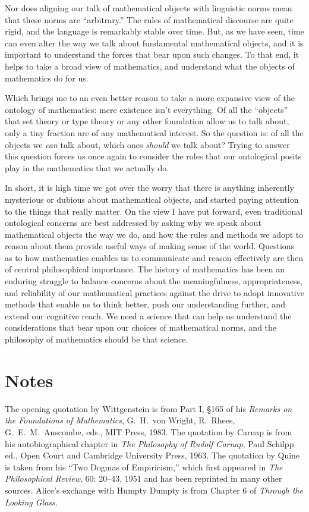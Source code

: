 \documentclass[11pt]{article}
\begin{document}
Nor does aligning our talk of mathematical objects with linguistic norms mean that these norms are ``arbitrary.'' The rules of mathematical discourse are quite rigid, and the language is remarkably stable over time. But, as we have seen, time can even alter the way we talk about fundamental mathematical objects, and it is important to understand the forces that bear upon such changes. To that end, it helps to take a broad view of mathematics, and understand what the objects of mathematics do for us.

Which brings me to an even better reason to take a more expansive view of the ontology of mathematics: mere existence isn't everything. Of all the ``objects'' that set theory or type theory or any other foundation allow us to talk about, only a tiny fraction are of any mathematical interest. So the question is: of all the objects we \emph{can} talk about, which ones \emph{should} we talk about? Trying to answer this question forces us once again to consider the roles that our ontological posits play in the mathematics that we actually do.

In short, it is high time we got over the worry that there is anything inherently mysterious or dubious about mathematical objects, and started paying attention to the things that really matter. On the view I have put forward, even traditional ontological concerns are best addressed by asking why we speak about mathematical objects the way we do, and how the rules and methods we adopt to reason about them provide useful ways of making sense of the world. Questions as to how mathematics enables us to communicate and reason effectively are then of central philosophical importance. The history of mathematics has been an enduring struggle to balance concerns about the meaningfulness, appropriateness, and reliability of our mathematical practices against the drive to adopt innovative methods that enable us to  think better, push our understanding further, and extend our cognitive reach. We need a science that can help us understand the considerations that bear upon our choices of mathematical norms, and the philosophy of mathematics should be that science.

\section*{Notes}

The opening quotation by Wittgenstein is from Part I, \S 165 of his \emph{Remarks on the Foundations of Mathematics}, G.~H.~von Wright, R.~Rhees, G.~E.~M.~Anscombe, eds., MIT Press, 1983. The quotation by Carnap is from his autobiographical chapter in \emph{The Philosophy of Rudolf Carnap}, Paul Schilpp ed., Open Court and Cambridge University Press, 1963. The quotation by Quine is taken from his ``Two Dogmas of Empiricism,'' which first appeared in \emph{The Philosophical Review}, 60: 20--43, 1951 and has been reprinted in many other sources. Alice's exchange with Humpty Dumpty is from Chapter 6 of \emph{Through the Looking Glass}.
\end{document}
